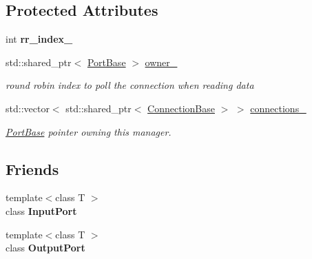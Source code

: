 \subsection*{Protected Attributes}
\begin{DoxyCompactItemize}
\item 
\hypertarget{classcoco_1_1_connection_manager_a96dd2c2e42aa9dd767746bb8e8771f2b}{}int {\bfseries rr\+\_\+index\+\_\+}\label{classcoco_1_1_connection_manager_a96dd2c2e42aa9dd767746bb8e8771f2b}

\item 
\hypertarget{classcoco_1_1_connection_manager_a004f216e362f701b6875ccd5fb68caec}{}std\+::shared\+\_\+ptr$<$ \hyperlink{classcoco_1_1_port_base}{Port\+Base} $>$ \hyperlink{classcoco_1_1_connection_manager_a004f216e362f701b6875ccd5fb68caec}{owner\+\_\+}\label{classcoco_1_1_connection_manager_a004f216e362f701b6875ccd5fb68caec}

\begin{DoxyCompactList}\small\item\em round robin index to poll the connection when reading data \end{DoxyCompactList}\item 
\hypertarget{classcoco_1_1_connection_manager_a1f34a36b21e6e124c3f954738f6717c4}{}std\+::vector$<$ std\+::shared\+\_\+ptr$<$ \hyperlink{classcoco_1_1_connection_base}{Connection\+Base} $>$ $>$ \hyperlink{classcoco_1_1_connection_manager_a1f34a36b21e6e124c3f954738f6717c4}{connections\+\_\+}\label{classcoco_1_1_connection_manager_a1f34a36b21e6e124c3f954738f6717c4}

\begin{DoxyCompactList}\small\item\em \hyperlink{classcoco_1_1_port_base}{Port\+Base} pointer owning this manager. \end{DoxyCompactList}\end{DoxyCompactItemize}
\subsection*{Friends}
\begin{DoxyCompactItemize}
\item 
\hypertarget{classcoco_1_1_connection_manager_aa750daec74c1bf813c092ea268f3b8f8}{}{\footnotesize template$<$class T $>$ }\\class {\bfseries Input\+Port}\label{classcoco_1_1_connection_manager_aa750daec74c1bf813c092ea268f3b8f8}

\item 
\hypertarget{classcoco_1_1_connection_manager_a1b667fb33da7060c4747eeafcd85db20}{}{\footnotesize template$<$class T $>$ }\\class {\bfseries Output\+Port}\label{classcoco_1_1_connection_manager_a1b667fb33da7060c4747eeafcd85db20}

\end{DoxyCompactItemize}


